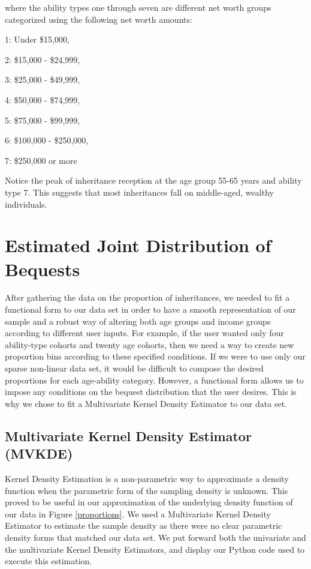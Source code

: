 \documentclass[letterpaper,12pt]{article}
\theoremstyle{definition}
\begin{document}
\begin{spacing}{1.5}
where the ability types one through seven are different net worth groups categorized using the following
net worth amounts:

1: Under \$15,000,

2: \$15,000 - \$24,999,

3: \$25,000 - \$49,999,

4: \$50,000 - \$74,999,

5: \$75,000 - \$99,999,

6: \$100,000 - \$250,000,

7: \$250,000 or more

Notice the peak of inheritance reception at the age group 55-65 years and ability type 7. This suggests that most inheritances fall on middle-aged, wealthy individuals.

\section{Estimated Joint Distribution of Bequests}\label{SecDist}

  After gathering the data on the proportion of inheritances, we needed to fit a functional form to our data set in order to have a smooth representation of our sample and a robust way of altering both age groups and income groups according to different user inputs. For example, if the user wanted only four ability-type cohorts and twenty age cohorts, then we need a way to create new proportion bins according to these specified conditions. If we were to use only our sparse non-linear data set, it would be difficult to compose the desired proportions for each age-ability category. However, a functional form allows us to impose any conditions on the bequest distribution that the user desires. This is why we chose to fit a Multivariate Kernel Density Estimator to our data set. 




  \subsection{Multivariate Kernel Density Estimator (MVKDE)}\label{SecDistMVKDE}


    Kernel Density Estimation is a non-parametric way to approximate a density function when the parametric form of the sampling density is unknown. This proved to be useful in our approximation of the underlying density function of our data in Figure \ref{proportions}. We used a Multivariate Kernel Density Estimator to estimate the sample density as there were no clear parametric density forms that matched our data set. We put forward both the univariate and the multivariate Kernel Density Estimators, and display our Python code used to execute this estimation.


\end{spacing}
\end{document}
